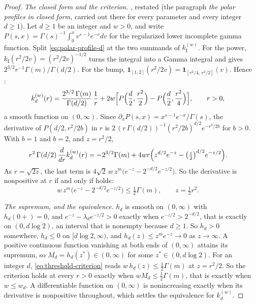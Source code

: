 \begin{proof}
\leanok
\emph{The closed form and the criterion.} , restated (the paragraph \emph{the polar
profiles in closed form}, carried out there for every parameter and every integer $d \ge 1$). Let
$d \ge 1$ be an integer and $w > 0$, and write
$P(s,x) = \Gamma(s)^{-1}\int_0^x v^{s-1}e^{-v}dv$ for the regularized lower incomplete gamma
function. Split \ref{eq:polar-profile-d} at the two summands of $k^{(w)}_{\mathrm I}$. For the
power, $k_{\mathrm I}(r^2/2v) = (r^2/2v)^{-1/2}$ turns the integral into a Gamma integral and
gives $2^{3/2}r^{-1}\Gamma(m)/\Gamma(d/2)$. For the bump,
$\mathbf{1}_{[1,2]}(r^2/2v) = \mathbf{1}_{[r^2/4,\,r^2/2]}(v)$. Hence :
\begin{equation}\label{eq:witness-polar}
  k^{(w)}_d(r) = \frac{2^{3/2}\,\Gamma(m)}{\Gamma(d/2)}\,\frac1r
   + 2w\Bigl[P\Bigl(\frac d2,\frac{r^2}2\Bigr) - P\Bigl(\frac d2,\frac{r^2}4\Bigr)\Bigr],
   \qquad r > 0 ,
\end{equation}
a smooth function on $(0,\infty)$. Since $\partial_x P(s,x) = x^{s-1}e^{-x}/\Gamma(s)$, the
derivative of $P(d/2, r^2/2b)$ in $r$ is $2\,(r\,\Gamma(d/2))^{-1}(r^2/2b)^{d/2}e^{-r^2/2b}$ for
$b > 0$. With $b = 1$ and $b = 2$, and $z = r^2/2$,
\[
  r^2\,\Gamma(d/2)\,\frac{d}{dr}k^{(w)}_d(r)
   = -2^{3/2}\Gamma(m) + 4wr\Bigl(z^{d/2}e^{-z} - \bigl(\tfrac z2\bigr)^{d/2}e^{-z/2}\Bigr) .
\]
As $r = \sqrt{2z}$, the last term is $4\sqrt2\,w\,z^m\bigl(e^{-z} - 2^{-d/2}e^{-z/2}\bigr)$. So the
derivative is nonpositive at $r$ if and only if  holds:
\begin{equation}\label{eq:threshold-criterion}
  w\,z^m\bigl(e^{-z} - 2^{-d/2}e^{-z/2}\bigr) \le \tfrac12\Gamma(m),
  \qquad z = \tfrac12 r^2 .
\end{equation}

\emph{The supremum, and the equivalence.} $h_d$ is smooth on $(0,\infty)$ with $h_d(0{+}) = 0$,
and $e^{-z} - \lambda_d e^{-z/2} > 0$ exactly when $e^{-z/2} > 2^{-d/2}$, that is exactly on
$(0, d\log 2)$, an interval that is nonempty because $d \ge 1$. So $h_d > 0$ somewhere,
$h_d \le 0$ on $[d\log 2,\infty)$, and $h_d(z) \le z^me^{-z} \to 0$ as $z \to \infty$. A positive
continuous function vanishing at both ends of $(0,\infty)$ attains its supremum, so
$M_d = h_d(z^*) \in (0,\infty)$ for some $z^* \in (0, d\log 2)$. For an integer $d$,
\ref{eq:threshold-criterion} reads $w\,h_d(z) \le \tfrac12\Gamma(m)$ at $z = r^2/2$. So the
criterion holds at every $r > 0$ exactly when $w M_d \le \tfrac12\Gamma(m)$, that is exactly when
$w \le w_d$. A differentiable function on $(0,\infty)$ is nonincreasing exactly when its
derivative is nonpositive throughout, which settles the equivalence for $k^{(w)}_d$.


\end{proof}
